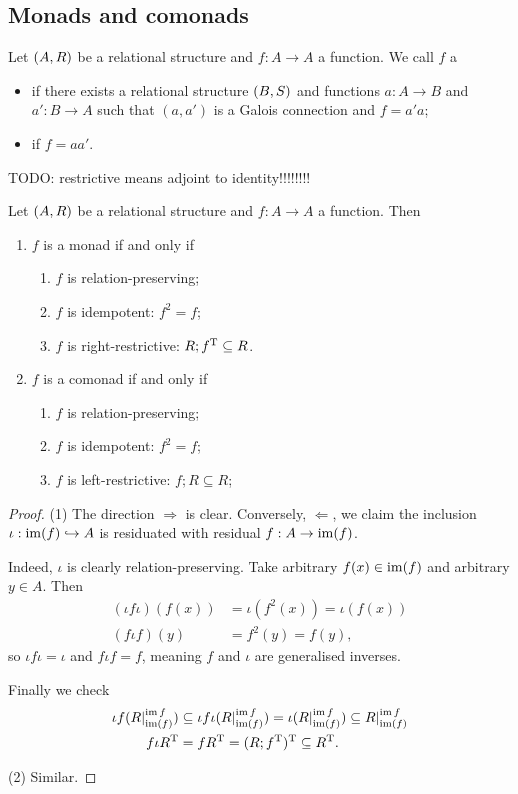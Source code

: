 \subsection{Monads and comonads}
\begin{definition}
Let $\left( A,R \right)$ be a relational structure and $f: A\to A$ a function. We call $f$ a
\begin{itemize}
\item {} if there exists a relational structure $\left( B,S \right)$ and functions $a: A\to B$ and $a': B\to A$ such that $(a, a')$ is a Galois connection and $f = a'a$;
\item {} if $f = aa'$.
\end{itemize}
\end{definition}

TODO: restrictive means adjoint to identity!!!!!!!!

\begin{lemma}
Let $\left( A,R \right)$ be a relational structure and $f: A \to A$ a function. Then
\begin{enumerate}
\item $f$ is a monad \textup{if and only if}
\begin{enumerate}
\item $f$ is relation-preserving;
\item $f$ is idempotent: $f^2 = f$;
\item $f$ is right-restrictive: $R;f^{\mathrm{T}} \subseteq R$.
\end{enumerate}
\item $f$ is a comonad \textup{if and only if}
\begin{enumerate}
\item $f$ is relation-preserving;
\item $f$ is idempotent: $f^2 = f$;
\item $f$ is left-restrictive: $f;R \subseteq R$;
\end{enumerate}
\end{enumerate}
\end{lemma}
\begin{proof}
(1) The direction $\Rightarrow$ is clear. Conversely, $\Leftarrow$, we claim the inclusion $\iota: \operatorname{im}(f) \hookrightarrow A$ is residuated with residual $f: A\to \operatorname{im}(f)$.

Indeed, $\iota$ is clearly relation-preserving. Take arbitrary $f(x)\in \operatorname{im}(f)$ and arbitrary $y\in A$. Then 
\begin{align*}
(\iota f \iota)(f(x)) &= \iota(f^2(x)) = \iota(f(x)) \\
(f \iota f)(y) &= f^2(y) = f(y),
\end{align*}
so $\iota f \iota = \iota$ and $f\iota f = f$, meaning $f$ and $\iota$ are generalised inverses.

Finally we check
\begin{align*}
\iota f (R|^{\operatorname{im} f}_{\operatorname{im}(f)}) &\subseteq \iota f \iota (R|^{\operatorname{im} f}_{\operatorname{im}(f)}) = \iota (R|^{\operatorname{im} f}_{\operatorname{im}(f)}) \subseteq R|^{\operatorname{im} f}_{\operatorname{im}(f)} \\
f \iota R^{\mathrm{T}} &= f R^{\mathrm{T}} = (R;f^{\mathrm{T}})^{\mathrm{T}} \subseteq R^{\mathrm{T}}.
\end{align*}

(2) Similar.
\end{proof}


